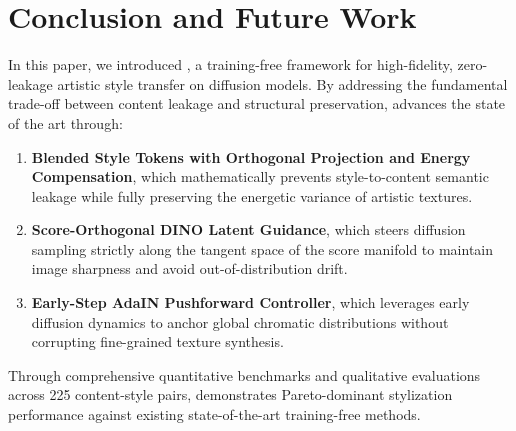 \section{Conclusion and Future Work}
\label{sec:conclusion}

In this paper, we introduced \textbf{\method}, a training-free framework for high-fidelity, zero-leakage artistic style transfer on diffusion models. By addressing the fundamental trade-off between content leakage and structural preservation, \method advances the state of the art through:
\begin{enumerate}
    \item \textbf{Blended Style Tokens with Orthogonal Projection and Energy Compensation}, which mathematically prevents style-to-content semantic leakage while fully preserving the energetic variance of artistic textures.
    \item \textbf{Score-Orthogonal DINO Latent Guidance}, which steers diffusion sampling strictly along the tangent space of the score manifold to maintain image sharpness and avoid out-of-distribution drift.
    \item \textbf{Early-Step AdaIN Pushforward Controller}, which leverages early diffusion dynamics to anchor global chromatic distributions without corrupting fine-grained texture synthesis.
\end{enumerate}
Through comprehensive quantitative benchmarks and qualitative evaluations across 225 content-style pairs, \method demonstrates Pareto-dominant stylization performance against existing state-of-the-art training-free methods.
